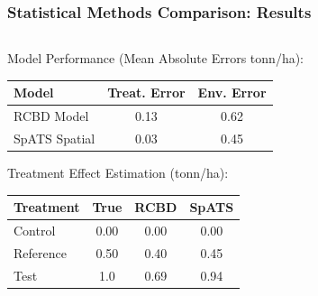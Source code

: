 \documentclass[aspectratio=43]{beamer}
\begin{document}
\begin{frame}
    \frametitle{\small Statistical Methods Comparison: Results}
    
    \begin{columns}
        \begin{column}{0.5\textwidth}
            \begin{block}{\small Model Performance \scriptsize (Mean Absolute Errors tonn/ha):}
                \begin{table}[h]
                    \centering
                    \scriptsize
                    \begin{tabular}{lcc}
                        \hline
                        \textbf{Model} & \textbf{Treat. Error} & \textbf{Env. Error} \\
                        \hline
                        RCBD Model & 0.13 & 0.62 \\
                        SpATS Spatial & 0.03 & 0.45 \\
                        \hline
                    \end{tabular}
                \end{table}
            \end{block}
            
            \begin{exampleblock}{\small Treatment Effect Estimation (tonn/ha):}
                \begin{table}[h]
                    \centering
                    \scriptsize
                    \begin{tabular}{lccc}
                        \hline
                        \textbf{Treatment} & \textbf{True} & \textbf{RCBD} & \textbf{SpATS} \\
                        \hline
                        Control & 0.00 & 0.00 & 0.00 \\
                        Reference & 0.50 & 0.40 & 0.45 \\
                        Test & 1.0 & 0.69 & 0.94 \\
                        \hline
                    \end{tabular}
                \end{table}
            \end{exampleblock}
        \end{column}
        

\end{columns}
\end{frame}
\end{document}
